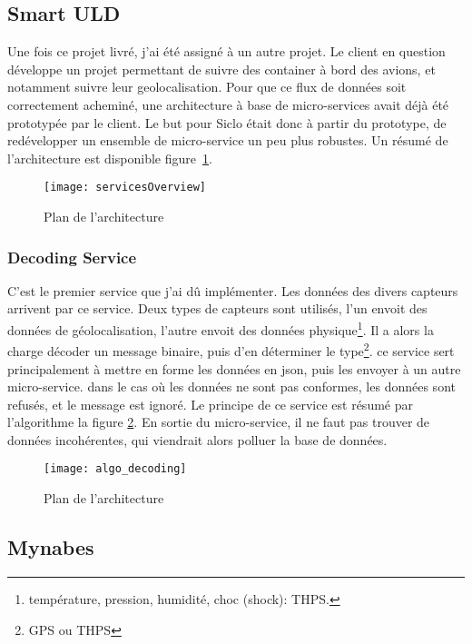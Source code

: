 \documentclass[../rapport.tex]{subfiles}
\begin{document}
        \subsection{Smart ULD}
        Une fois ce projet livré, j'ai été assigné à un autre projet.
        Le client en question développe un projet permettant de suivre des container
        à bord des avions, et notamment suivre leur geolocalisation.
        Pour que ce flux de données soit correctement acheminé, une architecture à base de micro-services
        avait déjà été prototypée par le client. Le but pour Siclo était donc à
        partir du prototype, de 
        redévelopper un ensemble de micro-service un peu plus robustes. Un
        résumé de l'architecture est disponible figure~\ref{fig:overview}.

        \begin{figure}
            \centering
            \texttt{[image: servicesOverview]}
            \caption{Plan de l'architecture}
            \label{fig:overview}
        \end{figure}

        \subsubsection{Decoding Service}
        C'est le premier service que j'ai dû implémenter. 
        Les données des divers capteurs arrivent par ce service. Deux types de
        capteurs sont utilisés, l'un envoit des données de géolocalisation,
        l'autre envoit des données physique\footnote{température, pression,
        humidité, choc (shock): THPS.}. Il a alors la charge décoder un message
        binaire, puis d'en déterminer le type\footnote{GPS ou THPS}. ce service
        sert principalement à mettre en forme les données en \gls{json}, puis
        les envoyer à un autre micro-service. dans le cas où les données ne
        sont pas conformes, les données sont refusés, et le message est ignoré.
        Le principe de ce service est résumé par l'algorithme la figure
        \ref{fig:algo_decoding}.
        En sortie du micro-service, il ne faut pas trouver de données
        incohérentes, qui viendrait alors 
        polluer la base de données.

        \begin{figure}
            \centering
            \texttt{[image: algo\_decoding]}
            \caption{Plan de l'architecture}
            \label{fig:algo_decoding}
        \end{figure}

        \subsection{Mynabes}\label{subsec:mynabes}
\end{document}
